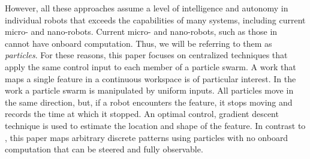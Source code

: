 However, all these approaches assume a level of intelligence and autonomy in individual robots that exceeds the capabilities of many systems, including current micro- and nano-robots. Current micro- and nano-robots, such as those in~\cite{Chowdhury2015,martel2015magnetotactic,Xiaohui2015magnetiteMicroswimmers} cannot have onboard computation. Thus, we will be referring to them as {\em particles}. For these reasons, this paper focuses on centralized techniques that apply the same control input to each member of a particle swarm. A work that maps a single feature in a continuous workspace \cite{ramachandran2015optimal} is of particular interest. In the work a particle swarm is manipulated by uniform inputs. All particles move in the same direction, but, if a robot encounters the feature, it stops moving and records the time at which it stopped. An optimal control, gradient descent technique is used to estimate the location and shape of the feature. 
In contrast to \cite{ramachandran2015optimal}, this paper maps arbitrary discrete patterns using particles with no onboard computation that can be steered and fully observable. %


